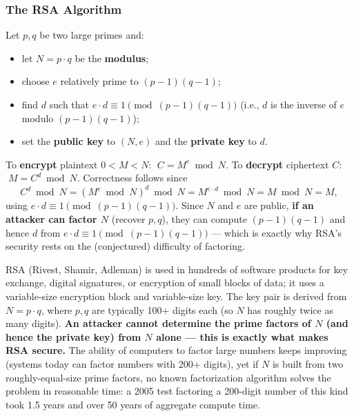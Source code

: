 \documentclass[12pt, a4paper]{article}
\begin{document}
\subsubsection{The RSA Algorithm}
Let $p,q$ be two large primes and:
\begin{itemize}
    \item let $N = p\cdot q$ be the \textbf{modulus};
    \item choose $e$ relatively prime to $(p-1)(q-1)$;
    \item find $d$ such that $e\cdot d \equiv 1 \pmod{(p-1)(q-1)}$ (i.e., $d$ is the inverse of $e$ modulo $(p-1)(q-1)$);
    \item set the \textbf{public key} to $(N,e)$ and the \textbf{private key} to $d$.
\end{itemize}
To \textbf{encrypt} plaintext $0<M<N$: $\;C = M^e \bmod N$. To \textbf{decrypt} ciphertext $C$: $\;M = C^d \bmod N$. Correctness follows since
\[
C^d \bmod N = (M^e \bmod N)^d \bmod N = M^{e\cdot d} \bmod N = M \bmod N = M,
\]
using $e\cdot d \equiv 1 \pmod{(p-1)(q-1)}$. Since $N$ and $e$ are public, \textbf{if an attacker can factor $N$} (recover $p,q$), they can compute $(p-1)(q-1)$ and hence $d$ from $e\cdot d \equiv 1 \pmod{(p-1)(q-1)}$ --- which is exactly why RSA's security rests on the (conjectured) difficulty of factoring.

RSA (Rivest, Shamir, Adleman) is used in hundreds of software products for key exchange, digital signatures, or encryption of small blocks of data; it uses a variable-size encryption block and variable-size key. The key pair is derived from $N=p\cdot q$, where $p,q$ are typically 100+ digits each (so $N$ has roughly twice as many digits). \textcolor{red!70!black}{\textbf{An attacker cannot determine the prime factors of $N$ (and hence the private key) from $N$ alone --- this is exactly what makes RSA secure.}} The ability of computers to factor large numbers keeps improving (systems today can factor numbers with 200+ digits), yet if $N$ is built from two roughly-equal-size prime factors, no known factorization algorithm solves the problem in reasonable time: a 2005 test factoring a 200-digit number of this kind took 1.5 years and over 50 years of aggregate compute time.
\end{document}
